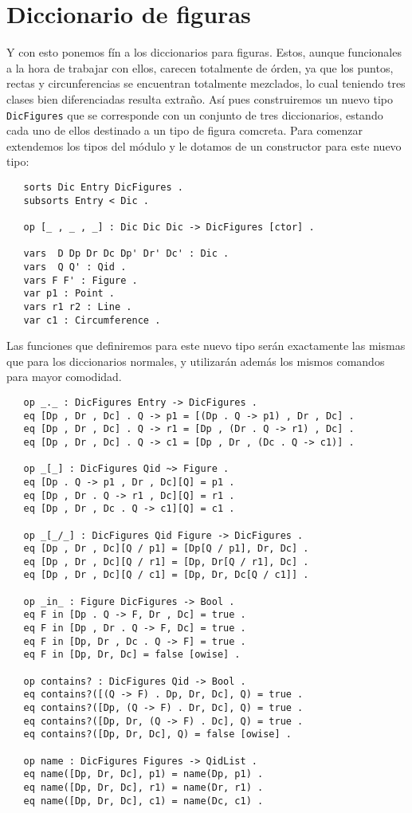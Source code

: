 \section{Diccionario de figuras}

Y con esto ponemos fín a los diccionarios para figuras. Estos, aunque funcionales a la hora de trabajar con ellos, carecen totalmente de órden, ya que los puntos, rectas y circunferencias se encuentran totalmente mezclados, lo cual teniendo tres clases bien diferenciadas resulta extraño. Así pues construiremos un nuevo tipo \texttt{DicFigures} que se corresponde con un conjunto de tres diccionarios, estando cada uno de ellos destinado a un tipo de figura comcreta. Para comenzar extendemos los tipos del módulo y le dotamos de un constructor para este nuevo tipo: \par

{\codesize
\begin{verbatim}
   sorts Dic Entry DicFigures .
   subsorts Entry < Dic .

   op [_ , _ , _] : Dic Dic Dic -> DicFigures [ctor] .

   vars  D Dp Dr Dc Dp' Dr' Dc' : Dic .
   vars  Q Q' : Qid .
   vars F F' : Figure .
   var p1 : Point .
   vars r1 r2 : Line .
   var c1 : Circumference .
\end{verbatim}
}

Las funciones que definiremos para este nuevo tipo serán exactamente las mismas que para los diccionarios normales, y utilizarán además los mismos comandos para mayor comodidad. \par

{\codesize
\begin{verbatim}
   op _._ : DicFigures Entry -> DicFigures .
   eq [Dp , Dr , Dc] . Q -> p1 = [(Dp . Q -> p1) , Dr , Dc] .
   eq [Dp , Dr , Dc] . Q -> r1 = [Dp , (Dr . Q -> r1) , Dc] .
   eq [Dp , Dr , Dc] . Q -> c1 = [Dp , Dr , (Dc . Q -> c1)] .

   op _[_] : DicFigures Qid ~> Figure .
   eq [Dp . Q -> p1 , Dr , Dc][Q] = p1 .
   eq [Dp , Dr . Q -> r1 , Dc][Q] = r1 .
   eq [Dp , Dr , Dc . Q -> c1][Q] = c1 . 

   op _[_/_] : DicFigures Qid Figure -> DicFigures .
   eq [Dp , Dr , Dc][Q / p1] = [Dp[Q / p1], Dr, Dc] .
   eq [Dp , Dr , Dc][Q / r1] = [Dp, Dr[Q / r1], Dc] .
   eq [Dp , Dr , Dc][Q / c1] = [Dp, Dr, Dc[Q / c1]] .

   op _in_ : Figure DicFigures -> Bool .
   eq F in [Dp . Q -> F, Dr , Dc] = true .
   eq F in [Dp , Dr . Q -> F, Dc] = true .
   eq F in [Dp, Dr , Dc . Q -> F] = true .
   eq F in [Dp, Dr, Dc] = false [owise] .

   op contains? : DicFigures Qid -> Bool .
   eq contains?([(Q -> F) . Dp, Dr, Dc], Q) = true .
   eq contains?([Dp, (Q -> F) . Dr, Dc], Q) = true .
   eq contains?([Dp, Dr, (Q -> F) . Dc], Q) = true .
   eq contains?([Dp, Dr, Dc], Q) = false [owise] .

   op name : DicFigures Figures -> QidList .
   eq name([Dp, Dr, Dc], p1) = name(Dp, p1) .
   eq name([Dp, Dr, Dc], r1) = name(Dr, r1) .
   eq name([Dp, Dr, Dc], c1) = name(Dc, c1) .
\end{verbatim}
}

